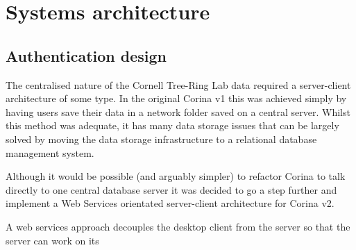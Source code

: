 
\chapter{Systems architecture}

\section{Authentication design}
\label{txt:authentication}

The centralised nature of the Cornell Tree-Ring Lab data required a server-client architecture of some type. In the original Corina v1 this was achieved simply by having users save their data in a network folder saved on a central server. Whilst this method was adequate, it has many data storage issues that can be largely solved by moving the data storage infrastructure to a relational database management system.  

Although it would be possible (and arguably simpler) to refactor Corina to talk directly to one central database server it was decided to go a step further and implement a Web Services orientated server-client architecture for Corina v2.  

A web services approach decouples the desktop client from the server so that the server can work on its 